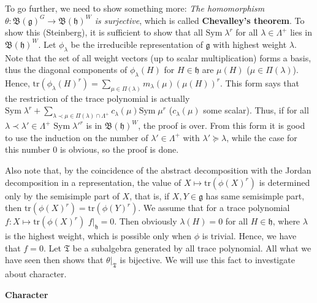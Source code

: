 \documentclass{article}
\newcommand{\tr}[1]{\mathrm{tr}#1}
\newcommand{\lie}[1]{\mathfrak{#1}}
\begin{document}
To go further, we need to show something more: \textit{The homomorphism $\theta : \mathfrak{B}(\lie{g})^G \to \mathfrak{B}(\lie{h})^W$ is surjective}, which is called \textbf{Chevalley's theorem}.
To show this (Steinberg), it is sufficient to show that all $\textrm{Sym}\; \lambda^r$ for all $\lambda \in \Lambda^+$ lies in $\mathfrak{B}(\lie{h})^W$.
Let $\phi_\lambda$ be the irreducible representation of $\lie{g}$ with highest weight $\lambda$.
Note that the set of all weight vectors (up to scalar multiplication) forms a basis, thus the diagonal components of $\phi_\lambda(H)$ for $H \in \lie{h}$ are $\mu(H)$ ($\mu \in \Pi(\lambda)$).
Hence, $\tr{(\phi_\lambda(H)^r)} = \sum_{\mu \in \Pi(\lambda)} m_\lambda(\mu) (\mu(H))^r$.
This form says that the restriction of the trace polynomial is actually $\textrm{Sym}\; \lambda^r + \sum_{\lambda \prec \mu \in \Pi(\lambda) \cap \Lambda^+} c_\lambda(\mu) \textrm{Sym}\; \mu^r$ ($c_\lambda(\mu)$ some scalar).
Thus, if for all $\lambda \prec \lambda' \in \Lambda^+$ $\textrm{Sym}\; \lambda'^r$ is in $\mathfrak{B}(\lie{h})^W$, the proof is over.
From this form it is good to use the induction on the number of $\lambda' \in \Lambda^+$ with $\lambda' \succeq \lambda$, while the case for this number 0 is obvious, so the proof is done.

Also note that, by the coincidence of the abstract decomposition with the Jordan decomposition in a representation, the value of $X \mapsto \tr{(\phi(X)^r)}$ is determined only by the semisimple part of $X$, that is, if $X, Y \in \lie{g}$ has same semisimple part, then $\tr{(\phi(X)^r)} = \tr{(\phi(Y)^r)}$.
We assume that for a trace polynomial $f : X \mapsto \tr{(\phi(X)^r)}$ $f|_\lie{h} = 0$.
Then obviously $\lambda(H) = 0$ for all $H \in \lie{h}$, where $\lambda$ is the highest weight, which is possible only when $\phi$ is trivial.
Hence, we have that $f = 0$.
Let $\mathfrak{T}$ be a subalgebra generated by all trace polynomial.
All what we have seen then shows that $\theta|_\mathfrak{T}$ is bijective.
We will use this fact to investigate about character.

\newpage

\textbf{Character}
\end{document}
